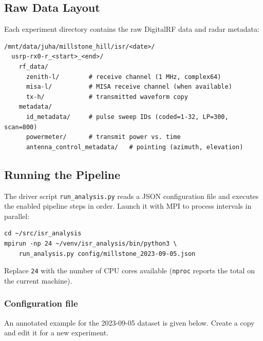 \subsection{Raw Data Layout}

Each experiment directory contains the raw DigitalRF data and radar metadata:
\begin{verbatim}
/mnt/data/juha/millstone_hill/isr/<date>/
  usrp-rx0-r_<start>_<end>/
    rf_data/
      zenith-l/        # receive channel (1 MHz, complex64)
      misa-l/          # MISA receive channel (when available)
      tx-h/            # transmitted waveform copy
    metadata/
      id_metadata/     # pulse sweep IDs (coded=1-32, LP=300, scan=800)
      powermeter/      # transmit power vs. time
      antenna_control_metadata/   # pointing (azimuth, elevation)
\end{verbatim}

\subsection{Running the Pipeline}

The driver script \texttt{run\_analysis.py} reads a JSON configuration file
and executes the enabled pipeline steps in order.
Launch it with MPI to process intervals in parallel:
\begin{verbatim}
cd ~/src/isr_analysis
mpirun -np 24 ~/venv/isr_analysis/bin/python3 \
    run_analysis.py config/millstone_2023-09-05.json
\end{verbatim}
Replace \texttt{24} with the number of CPU cores available
(\texttt{nproc} reports the total on the current machine).

\subsubsection*{Configuration file}

An annotated example for the 2023-09-05 dataset is given below.
Create a copy and edit it for a new experiment.

